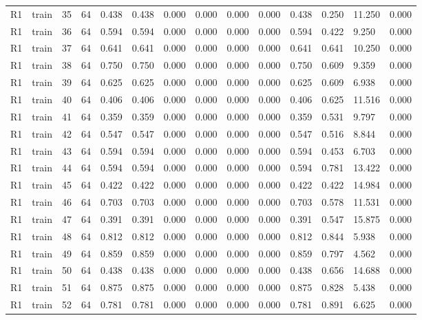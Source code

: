 \begin{table}[t]
\begin{tabular}{llllllllllllll}
R1 & train & 35 & 64 & 0.438 & 0.438 & 0.000 & 0.000 & 0.000 & 0.000 & 0.438 & 0.250 & 11.250 & 0.000 \\
R1 & train & 36 & 64 & 0.594 & 0.594 & 0.000 & 0.000 & 0.000 & 0.000 & 0.594 & 0.422 & 9.250 & 0.000 \\
R1 & train & 37 & 64 & 0.641 & 0.641 & 0.000 & 0.000 & 0.000 & 0.000 & 0.641 & 0.641 & 10.250 & 0.000 \\
R1 & train & 38 & 64 & 0.750 & 0.750 & 0.000 & 0.000 & 0.000 & 0.000 & 0.750 & 0.609 & 9.359 & 0.000 \\
R1 & train & 39 & 64 & 0.625 & 0.625 & 0.000 & 0.000 & 0.000 & 0.000 & 0.625 & 0.609 & 6.938 & 0.000 \\
R1 & train & 40 & 64 & 0.406 & 0.406 & 0.000 & 0.000 & 0.000 & 0.000 & 0.406 & 0.625 & 11.516 & 0.000 \\
R1 & train & 41 & 64 & 0.359 & 0.359 & 0.000 & 0.000 & 0.000 & 0.000 & 0.359 & 0.531 & 9.797 & 0.000 \\
R1 & train & 42 & 64 & 0.547 & 0.547 & 0.000 & 0.000 & 0.000 & 0.000 & 0.547 & 0.516 & 8.844 & 0.000 \\
R1 & train & 43 & 64 & 0.594 & 0.594 & 0.000 & 0.000 & 0.000 & 0.000 & 0.594 & 0.453 & 6.703 & 0.000 \\
R1 & train & 44 & 64 & 0.594 & 0.594 & 0.000 & 0.000 & 0.000 & 0.000 & 0.594 & 0.781 & 13.422 & 0.000 \\
R1 & train & 45 & 64 & 0.422 & 0.422 & 0.000 & 0.000 & 0.000 & 0.000 & 0.422 & 0.422 & 14.984 & 0.000 \\
R1 & train & 46 & 64 & 0.703 & 0.703 & 0.000 & 0.000 & 0.000 & 0.000 & 0.703 & 0.578 & 11.531 & 0.000 \\
R1 & train & 47 & 64 & 0.391 & 0.391 & 0.000 & 0.000 & 0.000 & 0.000 & 0.391 & 0.547 & 15.875 & 0.000 \\
R1 & train & 48 & 64 & 0.812 & 0.812 & 0.000 & 0.000 & 0.000 & 0.000 & 0.812 & 0.844 & 5.938 & 0.000 \\
R1 & train & 49 & 64 & 0.859 & 0.859 & 0.000 & 0.000 & 0.000 & 0.000 & 0.859 & 0.797 & 4.562 & 0.000 \\
R1 & train & 50 & 64 & 0.438 & 0.438 & 0.000 & 0.000 & 0.000 & 0.000 & 0.438 & 0.656 & 14.688 & 0.000 \\
R1 & train & 51 & 64 & 0.875 & 0.875 & 0.000 & 0.000 & 0.000 & 0.000 & 0.875 & 0.828 & 5.438 & 0.000 \\
R1 & train & 52 & 64 & 0.781 & 0.781 & 0.000 & 0.000 & 0.000 & 0.000 & 0.781 & 0.891 & 6.625 & 0.000 \\

\end{tabular}
\end{table}
